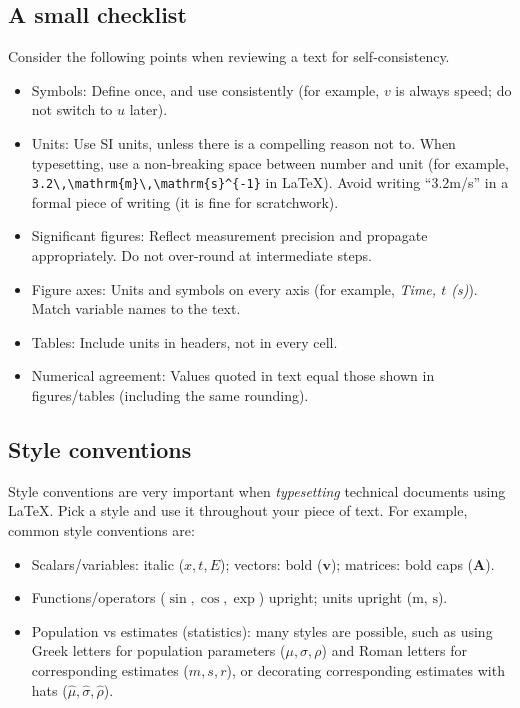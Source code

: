 \documentclass[
  a4paper,
  DIV=11,
  numbers=noendperiod,
  oneside]{scrreprt}
\providecommand{\tightlist}{%
  \setlength{\itemsep}{0pt}\setlength{\parskip}{0pt}}
\begin{document}
\subsection{A small checklist}\label{a-small-checklist}

Consider the following points when reviewing a text for
self-consistency.

\begin{itemize}
\tightlist
\item
  Symbols: Define once, and use consistently (for example, \(v\) is
  always speed; do not switch to \(u\) later).
\item
  Units: Use SI units, unless there is a compelling reason not to. When
  typesetting, use a non-breaking space between number and unit (for
  example,
  \texttt{3.2\textbackslash{},\textbackslash{}mathrm\{m\}\textbackslash{},\textbackslash{}mathrm\{s\}\^{}\{-1\}}
  in LaTeX). Avoid writing ``3.2m/s'' in a formal piece of writing (it
  is fine for scratchwork).
\item
  Significant figures: Reflect measurement precision and propagate
  appropriately. Do not over-round at intermediate steps.
\item
  Figure axes: Units and symbols on every axis (for example, \emph{Time,
  \(t\) (s)}). Match variable names to the text.
\item
  Tables: Include units in headers, not in every cell.
\item
  Numerical agreement: Values quoted in text equal those shown in
  figures/tables (including the same rounding).
\end{itemize}

\subsection{Style conventions}\label{style-conventions}

Style conventions are very important when \emph{typesetting} technical
documents using LaTeX. Pick a style and use it throughout your piece of
text. For example, common style conventions are:

\begin{itemize}
\tightlist
\item
  Scalars/variables: italic (\(x, t, E\)); vectors: bold
  (\(\mathbf{v}\)); matrices: bold caps (\(\mathbf{A}\)).
\item
  Functions/operators (\(\sin, \cos, \exp\)) upright; units upright
  (\(\mathrm{m},\,\mathrm{s}\)).
\item
  Population vs estimates (statistics): many styles are possible, such
  as using Greek letters for population parameters
  (\(\mu, \sigma, \rho\)) and Roman letters for corresponding estimates
  (\(m, s, r\)), or decorating corresponding estimates with hats
  (\(\hat{\mu}, \hat{\sigma}, \hat{\rho}\)).
\end{itemize}
\end{document}
